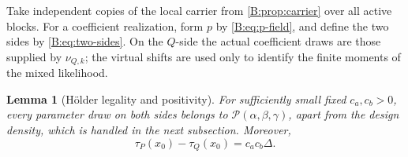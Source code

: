 \documentclass[11pt]{article}
\newtheorem{lemma}[lemma]{Lemma}
\newcommand{\cP}{\mathcal{P}}
\begin{document}
Take independent copies of the local carrier from \cref{B:prop:carrier} over
all active blocks.  For a coefficient realization, form \(p\) by
\eqref{B:eq:p-field}, and define the two sides by \eqref{B:eq:two-sides}.  On the
\(Q\)-side the actual coefficient draws are those supplied by
\(\nu_{Q,k}\); the virtual shifts are used only to identify the finite
moments of the mixed likelihood.

\begin{lemma}[Hölder legality and positivity]
\label{B:lem:legality}
For sufficiently small fixed \(c_a,c_b>0\), every parameter draw on both
sides belongs to \(\cP(\alpha,\beta,\gamma)\), apart from the design density,
which is handled in the next subsection.  Moreover,
\begin{equation}
 \tau_P(x_0)-\tau_Q(x_0)=c_ac_b\Delta.
 \label{B:eq:separation}
\end{equation}
\end{lemma}
\end{document}

